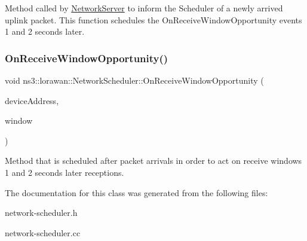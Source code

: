 Method called by \hyperlink{classns3_1_1lorawan_1_1NetworkServer}{Network\+Server} to inform the Scheduler of a newly arrived uplink packet. This function schedules the On\+Receive\+Window\+Opportunity events 1 and 2 seconds later. \mbox{\label{classns3_1_1lorawan_1_1NetworkScheduler_a9394830ed7fc351aa846a4c0635ddadc}} 
\subsubsection{\texorpdfstring{On\+Receive\+Window\+Opportunity()}{OnReceiveWindowOpportunity()}}
{\footnotesize\ttfamily void ns3\+::lorawan\+::\+Network\+Scheduler\+::\+On\+Receive\+Window\+Opportunity (\begin{DoxyParamCaption}\item[{\hyperlink{classns3_1_1lorawan_1_1LoraDeviceAddress}{Lora\+Device\+Address}}]{device\+Address,  }\item[{int}]{window }\end{DoxyParamCaption})}

Method that is scheduled after packet arrivals in order to act on receive windows 1 and 2 seconds later receptions. 

The documentation for this class was generated from the following files\+:\begin{DoxyCompactItemize}
\item 
network-\/scheduler.\+h\item 
network-\/scheduler.\+cc\end{DoxyCompactItemize}
